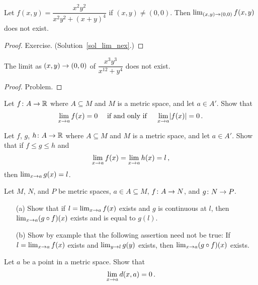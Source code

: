 \begin{exam}\label{lim_nex} Let $f(x,y) = \dfrac{x^2y^2}{x^2y^2 + (x + y)^4}$ if $(x,y) \ne (0,0)$.
Then $\lim_{(x,y) \rightarrow (0,0)}f(x,y)$ does not exist.
\end{exam}

\begin{proof} Exercise.   (Solution~\ref{sol_lim_nex}.) \ns  \end{proof}

\begin{exam} The limit as $(x,y) \rightarrow (0,0)$ of $\dfrac{x^3y^3}{x^{12} + y^4}$ does not exist.
\end{exam}

\begin{proof} Problem.  \ns  \end{proof}

\begin{prob}\label{abs_lim_R} Let $f\colon A \rightarrow \mathbb{R}$ where $A \subseteq M$ and $M$ is a metric
space, and let $a \in A'$.  Show that
    \[ \lim_{x \rightarrow a}f(x) = 0 \quad \text{ if and only if }
                  \quad \lim_{x \rightarrow a}\lvert f(x)\rvert = 0\,. \]
\end{prob}

\begin{prob} Let $f$, $g$, $h\colon A \rightarrow \mathbb{R}$ where $A \subseteq M$ and $M$ is a metric space,
and let $a \in A'$.  Show that if $f \le g \le h$ and
   \[ \lim_{x \rightarrow a}f(x) = \lim_{x \rightarrow a}h(x) = l\,, \]
then $\lim_{x \rightarrow a}g(x) = l$.
\end{prob}

\begin{prob} Let $M$, $N$, and $P$ be metric spaces, $a \in A \subseteq M$, $f\colon A \rightarrow N$,
and $g\colon N \rightarrow P$.
 \begin{enumerate}
  \item[(a)] Show that if $l = \lim_{x \rightarrow a}f(x)$ exists and $g$ is continuous at $l$, then
$\lim_{x \rightarrow a}(g \circ f)(x)$ exists and is equal to $g(l)$.
  \item[(b)] Show by example that the following assertion need not be true: If $l =
\lim_{x \rightarrow a}f(x)$ exists and $\lim_{y \rightarrow l}g(y)$ exists, then $\lim_{x \rightarrow a}(g \circ f)(x)$
exists.
 \end{enumerate}
\end{prob}

\begin{prob} Let $a$ be a point in a metric space. Show that
   \[ \lim_{x \rightarrow a}d(x,a) = 0\,. \]
\end{prob}

